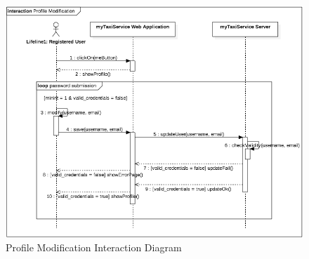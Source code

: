 				\begin{figure}[H]
					\centering
					\includegraphics[width=\textwidth, scale=0.5]{IMG/InteractionDiagrams/ProfileModification.png}
					\caption{Profile Modification Interaction Diagram}\label{sec:FigureProfileModification}
				\end{figure}